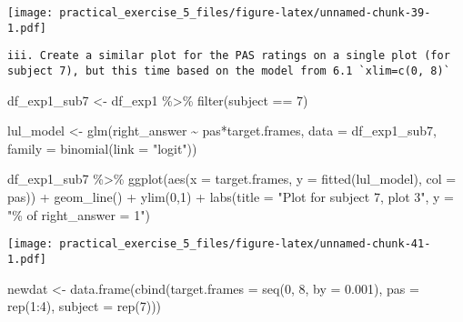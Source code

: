 \documentclass[
]{article}
\newenvironment{Shaded}{\begin{snugshade}}{\end{snugshade}}
\newcommand{\AttributeTok}[1]{\textcolor[rgb]{0.77,0.63,0.00}{#1}}
\newcommand{\DecValTok}[1]{\textcolor[rgb]{0.00,0.00,0.81}{#1}}
\newcommand{\FloatTok}[1]{\textcolor[rgb]{0.00,0.00,0.81}{#1}}
\newcommand{\FunctionTok}[1]{\textcolor[rgb]{0.00,0.00,0.00}{#1}}
\newcommand{\NormalTok}[1]{#1}
\newcommand{\OtherTok}[1]{\textcolor[rgb]{0.56,0.35,0.01}{#1}}
\newcommand{\SpecialCharTok}[1]{\textcolor[rgb]{0.00,0.00,0.00}{#1}}
\newcommand{\StringTok}[1]{\textcolor[rgb]{0.31,0.60,0.02}{#1}}
\begin{document}
\texttt{[image: practical\_exercise\_5\_files/figure-latex/unnamed-chunk-39-1.pdf]}

\begin{verbatim}
iii. Create a similar plot for the PAS ratings on a single plot (for subject 7), but this time based on the model from 6.1 `xlim=c(0, 8)`   
\end{verbatim}

\begin{Shaded}
\begin{Highlighting}[]
\NormalTok{df\_exp1\_sub7 }\OtherTok{\textless{}{-}}\NormalTok{ df\_exp1 }\SpecialCharTok{\%\textgreater{}\%} 
  \FunctionTok{filter}\NormalTok{(subject }\SpecialCharTok{==} \DecValTok{7}\NormalTok{)}

\NormalTok{lul\_model }\OtherTok{\textless{}{-}} \FunctionTok{glm}\NormalTok{(right\_answer }\SpecialCharTok{\textasciitilde{}}\NormalTok{ pas}\SpecialCharTok{*}\NormalTok{target.frames, }\AttributeTok{data =}\NormalTok{ df\_exp1\_sub7, }\AttributeTok{family =} \FunctionTok{binomial}\NormalTok{(}\AttributeTok{link =} \StringTok{"logit"}\NormalTok{))}
\end{Highlighting}
\end{Shaded}

\begin{Shaded}
\begin{Highlighting}[]
\NormalTok{df\_exp1\_sub7 }\SpecialCharTok{\%\textgreater{}\%} 
  \FunctionTok{ggplot}\NormalTok{(}\FunctionTok{aes}\NormalTok{(}\AttributeTok{x =}\NormalTok{ target.frames, }\AttributeTok{y =} \FunctionTok{fitted}\NormalTok{(lul\_model), }\AttributeTok{col =}\NormalTok{ pas)) }\SpecialCharTok{+} \FunctionTok{geom\_line}\NormalTok{() }\SpecialCharTok{+} \FunctionTok{ylim}\NormalTok{(}\DecValTok{0}\NormalTok{,}\DecValTok{1}\NormalTok{) }\SpecialCharTok{+} 
  \FunctionTok{labs}\NormalTok{(}\AttributeTok{title =} \StringTok{"Plot for subject 7, plot 3"}\NormalTok{, }\AttributeTok{y =} \StringTok{"\% of right\_answer = 1"}\NormalTok{)}
\end{Highlighting}
\end{Shaded}

\texttt{[image: practical\_exercise\_5\_files/figure-latex/unnamed-chunk-41-1.pdf]}

\begin{Shaded}
\begin{Highlighting}[]
\NormalTok{newdat }\OtherTok{\textless{}{-}} \FunctionTok{data.frame}\NormalTok{(}\FunctionTok{cbind}\NormalTok{(}\StringTok{\textquotesingle{}target.frames\textquotesingle{}} \OtherTok{=} \FunctionTok{seq}\NormalTok{(}\DecValTok{0}\NormalTok{, }\DecValTok{8}\NormalTok{, }\AttributeTok{by =} \FloatTok{0.001}\NormalTok{), }\StringTok{\textquotesingle{}pas\textquotesingle{}} \OtherTok{=} \FunctionTok{rep}\NormalTok{(}\DecValTok{1}\SpecialCharTok{:}\DecValTok{4}\NormalTok{), }\StringTok{\textquotesingle{}subject\textquotesingle{}} \OtherTok{=} \FunctionTok{rep}\NormalTok{(}\StringTok{\textquotesingle{}7\textquotesingle{}}\NormalTok{)))}
\end{Highlighting}
\end{Shaded}
\end{document}
